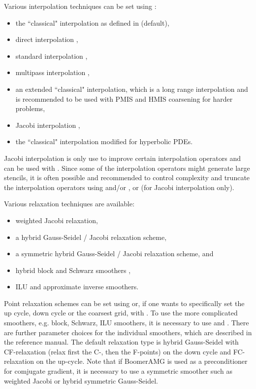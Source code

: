 Various interpolation techniques can be set using :
\begin{itemize}
\item the ``classical" interpolation as defined in \cite{Ruge_Stueben_1987} (default),
\item direct interpolation \cite{Stueben_1999},
\item standard interpolation \cite{Stueben_1999},
\item multipass interpolation \cite{Stueben_1999},
\item an extended ``classical" interpolation, which is a long range interpolation and is recommended to be used with PMIS and HMIS coarsening for harder problems,
\item Jacobi interpolation \cite{Stueben_1999},
\item the ``classical" interpolation modified for hyperbolic PDEs.
\end{itemize}
Jacobi interpolation is only use to improve certain interpolation operators and can be 
used with .
Since some of the interpolation operators might generate large stencils, it is often possible 
and recommended to control complexity and truncate the interpolation operators
using  and/or ,
or  (for Jacobi interpolation only).

Various relaxation techniques are available:
\begin{itemize}
\item weighted Jacobi relaxation,
\item a hybrid Gauss-Seidel / Jacobi relaxation scheme, 
\item a symmetric hybrid Gauss-Seidel / Jacobi relaxation scheme, and
\item hybrid block and Schwarz smoothers \cite{UMYang_2004},
\item ILU and approximate inverse smoothers.
\end{itemize}
Point relaxation schemes can be set using  or, if
one wants to specifically set the up cycle, down cycle or the coarsest grid, with 
. To use the more complicated smoothers,
e.g. block, Schwarz, ILU smoothers, it is necessary to use 
and . There are further parameter choices for the
individual smoothers, which are described in the reference manual.
The default relaxation type is hybrid Gauss-Seidel with CF-relaxation (relax first the C-,
then the F-points) on the down cycle and FC-relaxation on the up-cycle. Note that if
BoomerAMG is used as a preconditioner for comjugate gradient, it is necessary to use
a symmetric smoother such as weighted Jacobi or hybrid symmetric Gauss-Seidel.

